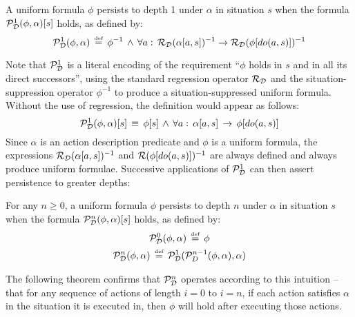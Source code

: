 \begin{defnL}
 A uniform formula $\phi$ persists
to depth 1 under $\alpha$ in situation $s$ when the formula $\mathcal{P}_{\mathcal{D}}^{1}(\phi,\alpha)[s]$
holds, as defined by:\label{def:persists-depth-n}\[
\mathcal{P}_{\mathcal{D}}^{1}(\phi,\alpha)\,\stackrel{\mbox{\tiny def}}{=}\,\phi^{-1}\,\wedge\,\forall a:\,\mathcal{R}_{\mathcal{D}}(\alpha[a,s])^{-1}\rightarrow\mathcal{R}_{\mathcal{D}}(\phi[do(a,s)])^{-1}\]

\end{defnL}
Note that $\mathcal{P}_{\mathcal{D}}^{1}$ is a literal encoding of the requirement
{}``$\phi$ holds in $s$ and in all its direct successors'', using
the standard regression operator $\mathcal{R}_{\mathcal{D}}$ and the situation-suppression
operator $\phi^{-1}$ to produce a situation-suppressed uniform formula.
Without the use of regression, the definition would appear as follows:\[
\mathcal{P}^{1}_{\mathcal{D}}(\phi,\alpha)[s]\,\equiv\,\phi[s]\,\wedge\,\forall a:\,\alpha[a,s]\,\rightarrow\,\phi[do(a,s)]\]
 Since $\alpha$ is an action description predicate and $\phi$ is
a uniform formula, the expressions $\mathcal{R}_{\mathcal{D}}(\alpha[a,s])^{-1}$
and $\mathcal{R}(\phi[do(a,s)])^{-1}$ are always defined and always produce
uniform formulae. Successive applications of $\mathcal{P}_{\mathcal{D}}^{1}$ can
then assert persistence to greater depths:

\begin{defnL}
 For any $n\geq0$, a uniform
formula $\phi$ persists to depth $n$ under $\alpha$ in situation
$s$ when the formula $\mathcal{P}_{\mathcal{D}}^{n}(\phi,\alpha)[s]$ holds, as
defined by:\begin{gather*}
\mathcal{P}_{\mathcal{D}}^{0}(\phi,\alpha)\,\stackrel{\mbox{\tiny def}}{=}\,\phi\\
\mathcal{P}_{\mathcal{D}}^{n}(\phi,\alpha)\,\stackrel{\mbox{\tiny def}}{=}\,\mathcal{P}_{\mathcal{D}}^{1}(\mathcal{P}_{D}^{n-1}(\phi,\alpha),\alpha)\end{gather*}

\end{defnL}
The following theorem confirms that $\mathcal{P}_{\mathcal{D}}^{n}$ operates according
to this intuition -- that for any sequence of actions of length $i=0$
to $i=n$, if each action satisfies $\alpha$ in the situation it
is executed in, then $\phi$ will hold after executing those actions.

